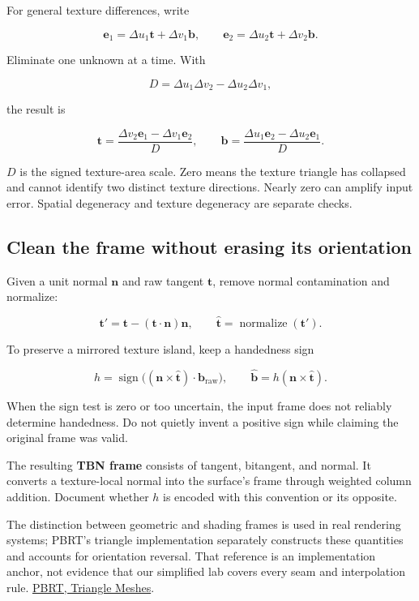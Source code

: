 For general texture differences, write

\[
\mathbf e_1=\Delta u_1\mathbf t+\Delta v_1\mathbf b,
\qquad
\mathbf e_2=\Delta u_2\mathbf t+\Delta v_2\mathbf b.
\]

Eliminate one unknown at a time. With

\[
D=\Delta u_1\Delta v_2-\Delta u_2\Delta v_1,
\]

the result is

\[
\mathbf t=\frac{\Delta v_2\mathbf e_1-\Delta v_1\mathbf e_2}{D},
\qquad
\mathbf b=\frac{\Delta u_1\mathbf e_2-\Delta u_2\mathbf e_1}{D}.
\]

\(D\) is the signed texture-area scale. Zero means the texture triangle has collapsed and cannot identify two distinct texture directions. Nearly zero can amplify input error. Spatial degeneracy and texture degeneracy are separate checks.

\subsection{Clean the frame without erasing its orientation}\label{01-foundations-i-ch017-clean-the-frame-without-erasing-its-orientation}

Given a unit normal \(\mathbf n\) and raw tangent \(\mathbf t\), remove normal contamination and normalize:

\[
\mathbf t'=\mathbf t-(\mathbf t\cdot\mathbf n)\mathbf n,
\qquad \widehat{\mathbf t}=\operatorname{normalize}(\mathbf t').
\]

To preserve a mirrored texture island, keep a handedness sign

\[
h=\operatorname{sign}\big((\mathbf n\times\widehat{\mathbf t})\cdot\mathbf b_{\mathrm{raw}}\big),
\qquad
\widehat{\mathbf b}=h(\mathbf n\times\widehat{\mathbf t}).
\]

When the sign test is zero or too uncertain, the input frame does not reliably determine handedness. Do not quietly invent a positive sign while claiming the original frame was valid.

The resulting \textbf{TBN frame} consists of tangent, bitangent, and normal. It converts a texture-local normal into the surface's frame through weighted column addition. Document whether \(h\) is encoded with this convention or its opposite.

The distinction between geometric and shading frames is used in real rendering systems; PBRT's triangle implementation separately constructs these quantities and accounts for orientation reversal. That reference is an implementation anchor, not evidence that our simplified lab covers every seam and interpolation rule. \href{https://www.pbr-book.org/4ed/Shapes/Triangle_Meshes}{PBRT, Triangle Meshes}.

